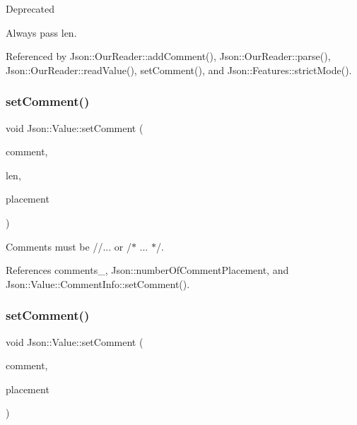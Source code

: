\begin{DoxyRefDesc}{Deprecated}
\item[\hyperlink{deprecated__deprecated000003}{Deprecated}]Always pass len. \end{DoxyRefDesc}


Referenced by Json\+::\+Our\+Reader\+::add\+Comment(), Json\+::\+Our\+Reader\+::parse(), Json\+::\+Our\+Reader\+::read\+Value(), set\+Comment(), and Json\+::\+Features\+::strict\+Mode().

\mbox{\label{classJson_1_1Value_a2900152a2887b410a9ddabe278b9d492_a2900152a2887b410a9ddabe278b9d492}} 
\subsubsection{\texorpdfstring{set\+Comment()}{setComment()}\hspace{0.1cm}{\footnotesize\ttfamily [2/3]}}
{\footnotesize\ttfamily void Json\+::\+Value\+::set\+Comment (\begin{DoxyParamCaption}\item[{const char $\ast$}]{comment,  }\item[{size\+\_\+t}]{len,  }\item[{\hyperlink{namespaceJson_a4fc417c23905b2ae9e2c47d197a45351_a4fc417c23905b2ae9e2c47d197a45351}{Comment\+Placement}}]{placement }\end{DoxyParamCaption})}



Comments must be //... or /$\ast$ ... $\ast$/. 



References comments\+\_\+, Json\+::number\+Of\+Comment\+Placement, and Json\+::\+Value\+::\+Comment\+Info\+::set\+Comment().

\mbox{\label{classJson_1_1Value_a2c5d13a5f45eb77e912008778e65b27f_a2c5d13a5f45eb77e912008778e65b27f}} 
\subsubsection{\texorpdfstring{set\+Comment()}{setComment()}\hspace{0.1cm}{\footnotesize\ttfamily [3/3]}}
{\footnotesize\ttfamily void Json\+::\+Value\+::set\+Comment (\begin{DoxyParamCaption}\item[{const \hyperlink{json_8h_a1e723f95759de062585bc4a8fd3fa4be_a1e723f95759de062585bc4a8fd3fa4be}{J\+S\+O\+N\+C\+P\+P\+\_\+\+S\+T\+R\+I\+NG} \&}]{comment,  }\item[{\hyperlink{namespaceJson_a4fc417c23905b2ae9e2c47d197a45351_a4fc417c23905b2ae9e2c47d197a45351}{Comment\+Placement}}]{placement }\end{DoxyParamCaption})}



